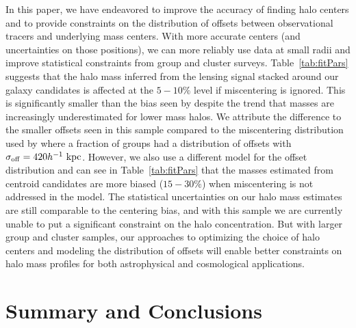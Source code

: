 \documentclass[12pt]{emulateapj}
\begin{document}
In this paper, we have endeavored to improve the accuracy of finding
halo centers and to provide constraints on the distribution of offsets
between observational tracers and underlying mass centers. With more
accurate centers (and uncertainties on those positions), we can more
reliably use data at small radii and improve statistical constraints
from group and cluster surveys. Table~\ref{tab:fitPars} suggests
that the halo mass inferred from the lensing signal stacked around our
galaxy candidates is affected at the $5-10\%$ level if miscentering is
ignored. This is significantly smaller than the bias seen by
\citet{Mandelbaum2010} despite the trend that masses are increasingly
underestimated for lower mass halos. We attribute the difference to
the smaller offsets seen in this sample compared to the miscentering
distribution used by \citet{Johnston2007b} where a fraction of groups
had a distribution of offsets with $\sigma_{\rm off}=420 h^{-1}~{\rm
  kpc}$. However, we also use a different model for the offset
distribution and can see in Table~\ref{tab:fitPars} that the masses
estimated from centroid candidates are more biased ($15-30\%$) when
miscentering is not addressed in the model. The statistical
uncertainties on our halo mass estimates are still comparable to the
centering bias, and with this sample we are currently unable to put a
significant constraint on the halo concentration. But with larger
group and cluster samples, our approaches to optimizing the choice of
halo centers and modeling the distribution of offsets will enable
better constraints on halo mass profiles for both astrophysical and
cosmological applications.


\section{Summary and Conclusions}
\label{s:conclusion}
\end{document}
